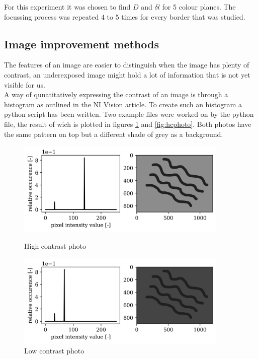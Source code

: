 For this experiment it was chosen to find $D$ and $\delta l$ for 5 colour planes. The focussing process was repeated 4 to 5 times for every border that was studied.\\

\subsection{Image improvement methods}
The features of an image are easier to distinguish when the image has plenty of contrast, an underexposed image might hold a lot of information that is not yet visible for us.\\
A way of qunatitatively expressing the contrast of an image is through a histogram as outlined in the NI Vision article\cite{histogram_theory}. To create such an histogram a python script has been written. Two example files were worked on by the python file, the result of wich is plotted in figures \ref{fig:lcphoto} and \ref{fig:hcphoto}. Both photos have the same pattern on top but a different shade of grey as a background.\\

\begin{figure}[h!]
    \centering
    \begin{minipage}{.5\textwidth}
      \centering
      \includegraphics[width=0.9\textwidth,keepaspectratio]{afbeeldingen/histograms/highcontrast.png}
      \caption{High contrast photo}
      \label{fig:hcphoto}
    \end{minipage}%
    \begin{minipage}{.5\textwidth}
      \centering
      \includegraphics[width=0.9\textwidth,keepaspectratio]{afbeeldingen/histograms/lowcontrast.png}
      \caption{Low contrast photo}
      \label{fig:lcphoto}
    \end{minipage}
\end{figure}

